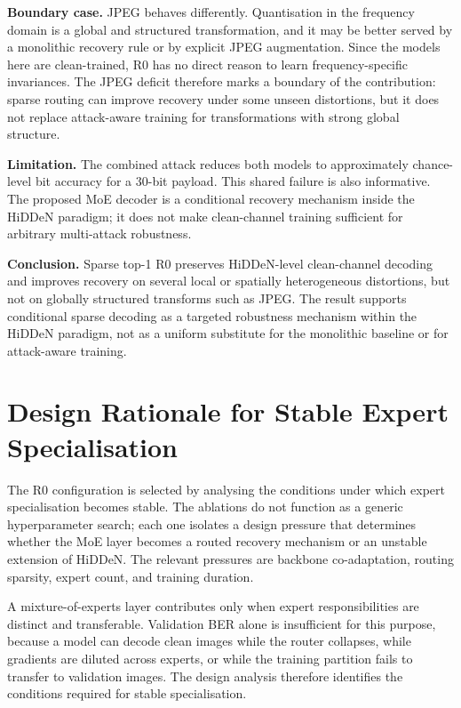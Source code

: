 ﻿\documentclass[12pt, a4paper, twoside]{report}
\numberwithin{equation}{chapter}
\begin{document}
\textbf{Boundary case.} JPEG behaves differently. Quantisation in the frequency domain is a global and structured transformation, and it may be better served by a monolithic recovery rule or by explicit JPEG augmentation. Since the models here are clean-trained, R0 has no direct reason to learn frequency-specific invariances. The JPEG deficit therefore marks a boundary of the contribution: sparse routing can improve recovery under some unseen distortions, but it does not replace attack-aware training for transformations with strong global structure.

\textbf{Limitation.} The combined attack reduces both models to approximately chance-level bit accuracy for a 30-bit payload. This shared failure is also informative. The proposed MoE decoder is a conditional recovery mechanism inside the HiDDeN paradigm; it does not make clean-channel training sufficient for arbitrary multi-attack robustness.

\textbf{Conclusion.} Sparse top-1 R0 preserves HiDDeN-level clean-channel decoding and improves recovery on several local or spatially heterogeneous distortions, but not on globally structured transforms such as JPEG. The result supports conditional sparse decoding as a targeted robustness mechanism within the HiDDeN paradigm, not as a uniform substitute for the monolithic baseline or for attack-aware training.

\section{Design Rationale for Stable Expert Specialisation}
\label{sec:rq3}

The R0 configuration is selected by analysing the conditions under which expert specialisation becomes stable. The ablations do not function as a generic hyperparameter search; each one isolates a design pressure that determines whether the MoE layer becomes a routed recovery mechanism or an unstable extension of HiDDeN. The relevant pressures are backbone co-adaptation, routing sparsity, expert count, and training duration.

A mixture-of-experts layer contributes only when expert responsibilities are distinct and transferable. Validation BER alone is insufficient for this purpose, because a model can decode clean images while the router collapses, while gradients are diluted across experts, or while the training partition fails to transfer to validation images. The design analysis therefore identifies the conditions required for stable specialisation.
\end{document}
